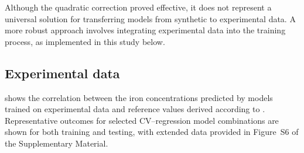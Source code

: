 \documentclass[10pt]{iopart}
\begin{document}
Although the quadratic correction proved effective, it does not represent a universal solution
for transferring models from synthetic to experimental data.
 A more robust approach involves integrating experimental data into the training process, as implemented in this study below.



\subsection{Experimental data}

 shows the correlation between the iron concentrations predicted by models trained on experimental data
and reference values derived according to \cite{Olikh2022:JMatSci,Olikh2021JAP}.
Representative outcomes for selected CV–regression model combinations are shown for both training and testing,
with extended data provided in Figure~S6 of the Supplementary Material.
\end{document}
